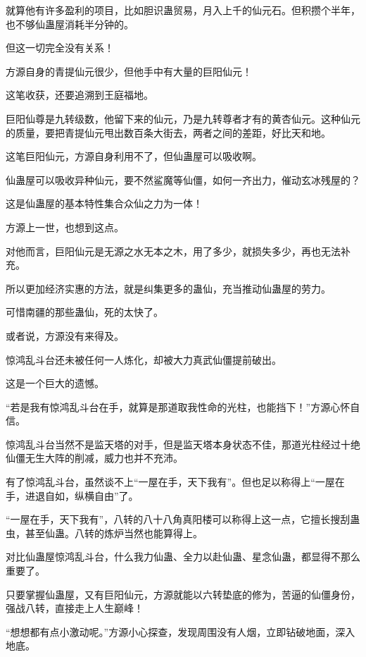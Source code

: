 \begin{this_body}
就算他有许多盈利的项目，比如胆识蛊贸易，月入上千的仙元石。但积攒个半年，也不够仙蛊屋消耗半分钟的。

但这一切完全没有关系！

方源自身的青提仙元很少，但他手中有大量的巨阳仙元！

这笔收获，还要追溯到王庭福地。

巨阳仙尊是九转级数，他留下来的仙元，乃是九转尊者才有的黄杏仙元。这种仙元的质量，要把青提仙元甩出数百条大街去，两者之间的差距，好比天和地。

这笔巨阳仙元，方源自身利用不了，但仙蛊屋可以吸收啊。

仙蛊屋可以吸收异种仙元，要不然鲨魔等仙僵，如何一齐出力，催动玄冰残屋的？

这是仙蛊屋的基本特性集合众仙之力为一体！

方源上一世，也想到这点。

对他而言，巨阳仙元是无源之水无本之木，用了多少，就损失多少，再也无法补充。

所以更加经济实惠的方法，就是纠集更多的蛊仙，充当推动仙蛊屋的劳力。

可惜南疆的那些蛊仙，死的太快了。

或者说，方源没有来得及。

惊鸿乱斗台还未被任何一人炼化，却被大力真武仙僵提前破出。

这是一个巨大的遗憾。

“若是我有惊鸿乱斗台在手，就算是那道取我性命的光柱，也能挡下！”方源心怀自信。

惊鸿乱斗台当然不是监天塔的对手，但是监天塔本身状态不佳，那道光柱经过十绝仙僵无生大阵的削减，威力也并不充沛。

有了惊鸿乱斗台，虽然谈不上“一屋在手，天下我有”。但也足以称得上“一屋在手，进退自如，纵横自由”了。

“一屋在手，天下我有”，八转的八十八角真阳楼可以称得上这一点，它擅长搜刮蛊虫，甚至仙蛊。八转的炼炉当然也能算得上。

对比仙蛊屋惊鸿乱斗台，什么我力仙蛊、全力以赴仙蛊、星念仙蛊，都显得不那么重要了。

只要掌握仙蛊屋，又有巨阳仙元，方源就能以六转垫底的修为，苦逼的仙僵身份，强战八转，直接走上人生巅峰！

“想想都有点小激动呢。”方源小心探查，发现周围没有人烟，立即钻破地面，深入地底。

\end{this_body}

